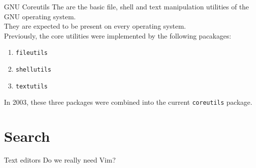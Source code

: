 \documentclass[11pt]{beamer}
\begin{document}
		\begin{frame}{GNU Coreutils}
				The {\color{blue}{GNU Core Utilities}} are the basic file, shell and text manipulation utilities of the GNU operating system. \\
				They are expected to be present on every operating system. \\
				Previously, the core utilities were implemented by the following pacakages:
				\begin{enumerate}
				  \item \texttt{fileutils} 
				  \item \texttt{shellutils} 
				  \item \texttt{textutils}
				\end{enumerate}	
				In 2003, these three packages were combined into the current \texttt{coreutils} package.
		\end{frame}
	
	\section{Search}
		\begin{frame}{Text editors}
			Do we really need Vim?	
		\end{frame}
\end{document}
